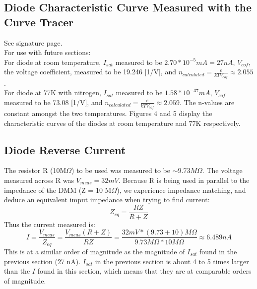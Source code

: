 \documentclass{article}
\begin{document}
\subsection{Diode Characteristic Curve Measured with the Curve Tracer}
    See signature page.\\ For use with future sections:
    \\\indent For diode at room temperature, $I_{sat}$ measured to be $2.70*10^{-5} mA = 27 nA$, $V_{cof}$, the voltage coefficient, measured to be 19.246 [1/V], and $n_{calculated} = \frac{e}{kTV_{cof}} \approx 2.055$.
    \\\indent For diode at 77K with nitrogen, $I_{sat}$ measured to be $1.58*10^{-37} mA$, $V_{cof}$ measured to be 73.08 [1/V], and $n_{calculated} = \frac{e}{kTV_{cof}} \approx 2.059$. The n-values are constant amongst the two temperatures. Figures 4 and 5 display the characteristic curves of the diodes at room temperature and 77K respectively.
\subsection{Diode Reverse Current}
    The resistor R (10M$\Omega$) to be used was measured to be $\sim 9.73M\Omega$. The voltage measured across R was $V_{meas} = 32 mV$. Because R is being used in parallel to the impedance of the DMM (Z = 10 M$\Omega$), we experience impedance matching, and deduce an equivalent imput impedance when trying to find current:
    \begin{equation}
        Z_{eq} = \frac{RZ}{R+Z}
    \end{equation}
    Thus the current measured is:
    \begin{equation}
        I = \frac{V_{meas}}{Z_{eq}} = \frac{V_{meas}(R+Z)}{RZ} = \frac{32mV*(9.73 + 10)M\Omega}{9.73M\Omega*10M\Omega} \approx 6.489 nA
    \end{equation}
    This is at a similar order of magnitude as the magnitude of $I_{sat}$ found in the previous section (27 nA). $I_{sat}$ in the previous section is about 4 to 5 times larger than the $I$ found in this section, which means that they are at comparable orders of magnitude.
\end{document}

